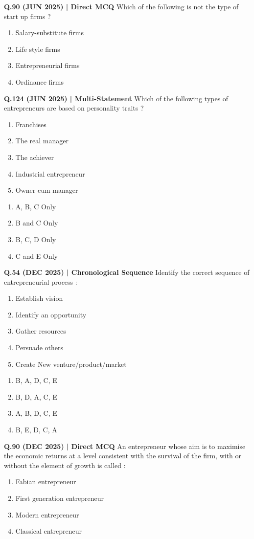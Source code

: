 \documentclass{article}
\begin{document}
\textbf{Q.90 (JUN 2025) | Direct MCQ}
Which of the following is not the type of start up firms ?
\begin{enumerate}[label=(\arabic*)]
    \item Salary-substitute firms
    \item Life style firms
    \item Entrepreneurial firms
    \item Ordinance firms
\end{enumerate}

\textbf{Q.124 (JUN 2025) | Multi-Statement}
Which of the following types of entrepreneurs are based on personality traits ?
\begin{enumerate}[label=\Alph*.]
    \item Franchises
    \item The real manager
    \item The achiever
    \item Industrial entrepreneur
    \item Owner-cum-manager
\end{enumerate}
\begin{enumerate}[label=(\arabic*)]
    \item A, B, C Only
    \item B and C Only
    \item B, C, D Only
    \item C and E Only
\end{enumerate}

\textbf{Q.54 (DEC 2025) | Chronological Sequence}
Identify the correct sequence of entrepreneurial process :
\begin{enumerate}[label=\Alph*.]
    \item Establish vision
    \item Identify an opportunity
    \item Gather resources
    \item Persuade others
    \item Create New venture/product/market
\end{enumerate}
\begin{enumerate}[label=(\arabic*)]
    \item B, A, D, C, E
    \item B, D, A, C, E
    \item A, B, D, C, E
    \item B, E, D, C, A
\end{enumerate}

\textbf{Q.90 (DEC 2025) | Direct MCQ}
An entrepreneur whose aim is to maximise the economic returns at a level consistent with the survival of the firm, with or without the element of growth is called :
\begin{enumerate}[label=(\arabic*)]
    \item Fabian entrepreneur
    \item First generation entrepreneur
    \item Modern entrepreneur
    \item Classical entrepreneur
\end{enumerate}
\end{document}

